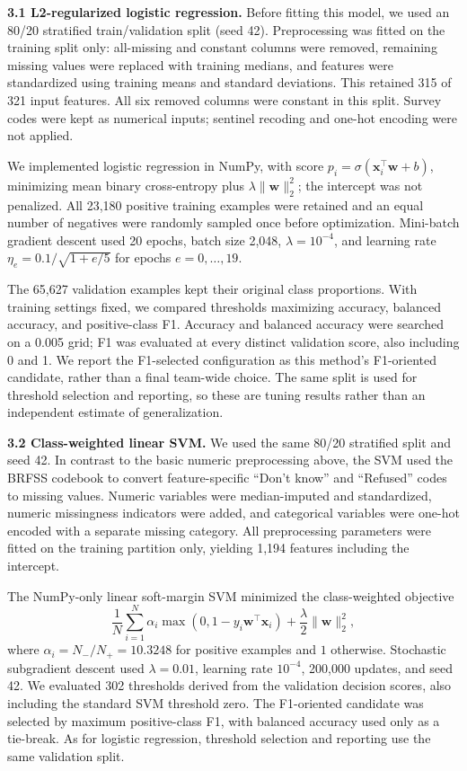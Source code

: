 \documentclass[11pt,a4paper]{article}
\begin{document}
\textbf{3.1 L2-regularized logistic regression.}
Before fitting this model, we used an 80/20 stratified train/validation split
(seed 42). Preprocessing was fitted on the training split only: all-missing
and constant columns were removed, remaining missing values were replaced
with training medians, and features were standardized using training means
and standard deviations. This retained 315 of 321 input features. All six removed columns were constant in this split. Survey
codes were kept as numerical inputs; sentinel recoding and one-hot encoding
were not applied.

We implemented logistic regression in NumPy, with score
$p_i=\sigma(\mathbf{x}_i^\top\mathbf{w}+b)$, minimizing mean binary
cross-entropy plus $\lambda\lVert\mathbf{w}\rVert_2^2$; the intercept was
not penalized. All 23,180 positive training examples were retained and an
equal number of negatives were randomly sampled once before optimization.
Mini-batch gradient descent used 20 epochs, batch size 2,048,
$\lambda=10^{-4}$, and learning rate
$\eta_e=0.1/\sqrt{1+e/5}$ for epochs $e=0,\ldots,19$.

The 65,627 validation examples kept their original class proportions.
With training settings fixed, we compared thresholds maximizing accuracy,
balanced accuracy, and positive-class F1. Accuracy and balanced accuracy
were searched on a 0.005 grid; F1 was evaluated at every distinct validation
score, also including 0 and 1. We report the F1-selected configuration as
this method's F1-oriented candidate, rather than a final team-wide choice.
The same split is used for threshold selection and reporting, so these are
tuning results rather than an independent estimate of generalization.

\textbf{3.2 Class-weighted linear SVM.}
We used the same 80/20 stratified split and seed 42. In contrast to the basic
numeric preprocessing above, the SVM used the BRFSS codebook to convert
feature-specific ``Don't know'' and ``Refused'' codes to missing values.
Numeric variables were median-imputed and standardized, numeric missingness
indicators were added, and categorical variables were one-hot encoded with a
separate missing category. All preprocessing parameters were fitted on the
training partition only, yielding 1,194 features including the intercept.

The NumPy-only linear soft-margin SVM minimized the class-weighted objective
\begin{equation}
  \frac{1}{N}\sum_{i=1}^{N}\alpha_i
  \max\!\left(0,1-y_i\mathbf{w}^{\top}\mathbf{x}_i\right)
  +\frac{\lambda}{2}\lVert\mathbf{w}\rVert_2^2,
\end{equation}
where $\alpha_i=N_-/N_+=10.3248$ for positive examples and $1$ otherwise.
Stochastic subgradient descent used $\lambda=0.01$, learning rate $10^{-4}$,
200,000 updates, and seed 42. We evaluated 302 thresholds derived from the
validation decision scores, also including the standard SVM threshold zero.
The F1-oriented candidate was selected by maximum positive-class F1, with
balanced accuracy used only as a tie-break. As for logistic regression,
threshold selection and reporting use the same validation split.
\end{document}

